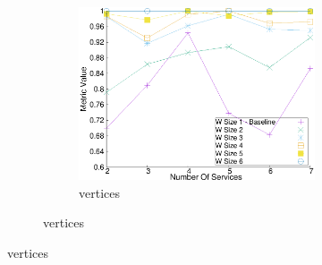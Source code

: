 \begin{figure}[H]
\begin{adjustbox}{minipage=\linewidth,scale=0.75}
\begin{subfigure}{0.45\textwidth}
          \begin{subfigure}{\textwidth}
            \includegraphics[width=\textwidth]{Images/graphs/window_quality_performance_diff_perce_n7_s7_20_100_n6}
            \caption{ vertices}
            \label{fig:quality_window_wide_perce_n6}
          \end{subfigure}


\end{subfigure}
\end{adjustbox}
\end{figure}
